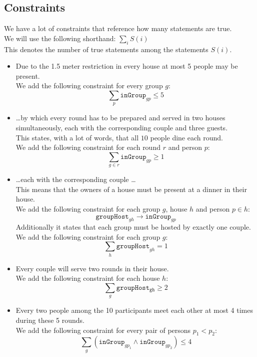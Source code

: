 \documentclass{scrartcl}
\begin{document}
\subsection{Constraints} %
\label{sub:dinner_constraints}
We have a lot of constraints that reference how many statements are true.\\
We will use the following shorthand: $\sum_i S(i)$\\
This denotes the number of true statements among the statements $S(i)$.
\begin{itemize}
	\item Due to the 1.5 meter restriction in every house at most 5 people may be present.\\
	We add the following constraint for every group $g$:
	$$\sum_{p}\mathtt{inGroup}_{gp}\leq 5$$
	\item \ldots by which every round has to be prepared and served in two houses simultaneously, each with the corresponding couple and three guests.\\
	This states, with a lot of words, that all $10$ people dine each round.\\
	We add the following constraint for each round $r$ and person $p$:
	$$\sum_{g\in r}\mathtt{inGroup}_{gp}\geq 1$$
	\item \ldots each with the corresponding couple \ldots\\
	This means that the owners of a house must be present at a dinner in their house.\\
	We add the following constraint for each group $g$, house $h$ and person $p\in h$:
	$$\mathtt{groupHost}_{gh}\to\mathtt{inGroup}_{gp}$$
	Additionally it states that each group must be hosted by exactly one couple.
	We add the following constraint for each group $g$:
	$$\sum_h\mathtt{groupHost}_{gh} = 1$$
	\item Every couple will serve two rounds in their house.\\
	We add the following constraint for each house $h$:\\
	$$\sum_g\mathtt{groupHost_{gh}}\geq 2$$
	\item Every two people among the 10 participants meet each other at most 4 times during these 5 rounds.\\
	We add the following constraint for every pair of persons $p_1<p_2$:\\
	$$\sum_g(\mathtt{inGroup}_{gp_1}\land\mathtt{inGroup}_{gp_2})\leq 4$$

\end{itemize}
\end{document}
